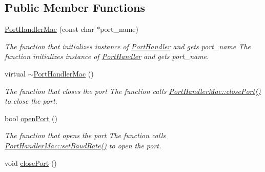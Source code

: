 \subsection*{Public Member Functions}
\begin{DoxyCompactItemize}
\item 
\hyperlink{classmercury_1_1_port_handler_mac_a96cd1a75a323cf60fd1d55b377548466}{Port\+Handler\+Mac} (const char $\ast$port\+\_\+name)\hypertarget{classmercury_1_1_port_handler_mac_a96cd1a75a323cf60fd1d55b377548466}{}\label{classmercury_1_1_port_handler_mac_a96cd1a75a323cf60fd1d55b377548466}

\begin{DoxyCompactList}\small\item\em The function that initializes instance of \hyperlink{classmercury_1_1_port_handler}{Port\+Handler} and gets port\+\_\+name  The function initializes instance of \hyperlink{classmercury_1_1_port_handler}{Port\+Handler} and gets port\+\_\+name. \end{DoxyCompactList}\item 
virtual \hyperlink{classmercury_1_1_port_handler_mac_a48c27651e31891a2bf917bdd7aa597c6}{$\sim$\+Port\+Handler\+Mac} ()\hypertarget{classmercury_1_1_port_handler_mac_a48c27651e31891a2bf917bdd7aa597c6}{}\label{classmercury_1_1_port_handler_mac_a48c27651e31891a2bf917bdd7aa597c6}

\begin{DoxyCompactList}\small\item\em The function that closes the port  The function calls \hyperlink{classmercury_1_1_port_handler_mac_aa442d4db9097cd2c5ebf8477d13c0c11}{Port\+Handler\+Mac\+::close\+Port()} to close the port. \end{DoxyCompactList}\item 
bool \hyperlink{classmercury_1_1_port_handler_mac_a572562910975b8ffaf8dd025242dcc9a}{open\+Port} ()
\begin{DoxyCompactList}\small\item\em The function that opens the port  The function calls \hyperlink{classmercury_1_1_port_handler_mac_a05773915cdf00fa5357e4c08e390d556}{Port\+Handler\+Mac\+::set\+Baud\+Rate()} to open the port. \end{DoxyCompactList}\item 
void \hyperlink{classmercury_1_1_port_handler_mac_aa442d4db9097cd2c5ebf8477d13c0c11}{close\+Port} ()\hypertarget{classmercury_1_1_port_handler_mac_aa442d4db9097cd2c5ebf8477d13c0c11}{}\label{classmercury_1_1_port_handler_mac_aa442d4db9097cd2c5ebf8477d13c0c11}


\end{DoxyCompactItemize}
